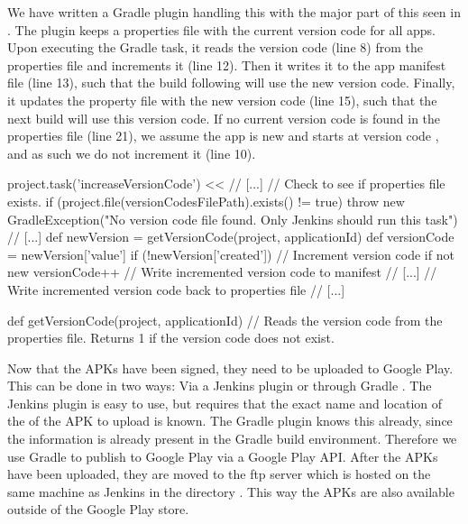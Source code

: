 We have written a Gradle plugin handling this with the major part of this seen in . The plugin keeps a properties file with the current version code for all apps. Upon executing the  Gradle task, it reads the version code (line 8) from the properties file and increments it (line 12). Then it writes it to the app manifest file (line 13), such that the build following will use the new version code. Finally, it updates the property file with the new version code (line 15), such that the next build will use this version code. If no current version code is found in the properties file (line 21), we assume the app is new and starts at version code , and as such we do not increment it (line 10).
\begin{gradlecode}[caption=Part of our Gradle plugin for updating version code,label=lst:gradle_versioncode]
project.task('increaseVersionCode') << {
    // [...]
    // Check to see if properties file exists.
    if (project.file(versionCodesFilePath).exists() != true) {
        throw new GradleException("No version code file found. Only Jenkins should run this task")
    }
    // [...]
    def newVersion = getVersionCode(project, applicationId)
    def versionCode = newVersion['value']
    if (!newVersion['created']) {
        // Increment version code if not new
        versionCode++
        // Write incremented version code to manifest
        // [...]
        // Write incremented version code back to properties file
        // [...]
    }
}

def getVersionCode(project, applicationId) {
    // Reads the version code from the properties file. Returns 1 if the version code does not exist.
}
\end{gradlecode}
 
Now that the APKs have been signed, they need to be uploaded to Google Play. This can be done in two ways: Via a Jenkins plugin \parencite{jenkins-play-plugin} or through Gradle \parencite{gradle-play-plugin}. The Jenkins plugin is easy to use, but requires that the exact name and location of the of the APK to upload is known. The Gradle plugin knows this already, since the information is already present in the Gradle build environment. Therefore we use Gradle to publish to Google Play via a Google Play API\@. After the APKs have been uploaded, they are moved to the ftp server which is hosted on the same machine as Jenkins in the directory . This way the APKs are also available outside of the Google Play store.